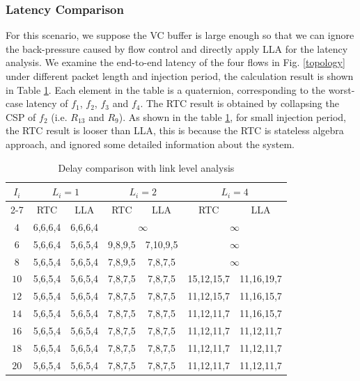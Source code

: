 \documentclass[10pt,journal]{IEEEtran}
\begin{document}
\subsubsection{Latency Comparison}
For this scenario, we suppose the VC buffer is large enough so that we can ignore the back-pressure caused by flow control and directly apply LLA for the latency analysis. We examine the end-to-end latency of the four flows in Fig. \ref{topology} under different packet length and injection period, the calculation result is shown in Table \ref{LLAvsRTC}. Each element in the table is a quaternion, corresponding to the worst-case latency of $f_1$, $f_2$, $f_3$ and $f_4$. The RTC result is obtained by collapsing the CSP of $f_2$ (i.e. $R_{13}$ and $R_{9}$). As shown in the table \ref{LLAvsRTC}, for small injection period, the RTC result is looser than LLA, this is because the RTC is stateless algebra approach, and ignored some detailed information about the system.
\begin{table}[htbp]
\centering
\caption{\label{LLAvsRTC}Delay comparison with link level analysis}
\begin{tabular}{|c|c|c|c|c|c|c|}
\hline
\multirow{3}{*}{$I_i$}  & \multicolumn{2}{|c|}{$L_i=1$} & \multicolumn{2}{|c|}{$L_i=2$}    &   \multicolumn{2}{|c|}{$L_i=4$} \\
\cline{2-7}
& RTC & LLA & RTC & LLA &   RTC &   LLA\\
\hline
$4$ &   6,6,6,4 &   6,6,6,4 &   \multicolumn{2}{|c|}{$\infty$}   &   \multicolumn{2}{|c|}{$\infty$}\\
\hline
$6$ &   5,6,6,4 &   5,6,5,4 &   9,8,9,5 &   7,10,9,5   &   \multicolumn{2}{|c|}{$\infty$}\\
\hline
$8$ &   5,6,5,4 &   5,6,5,4 &   7,8,9,5 &   7,8,7,5 &   \multicolumn{2}{|c|}{$\infty$}\\
\hline
$10$ &   5,6,5,4 &   5,6,5,4 &   7,8,7,5 &   7,8,7,5 &   15,12,15,7 &   11,16,19,7 \\
\hline
$12$    &   5,6,5,4 &   5,6,5,4 &   7,8,7,5 &   7,8,7,5 &   11,12,15,7  &   11,16,15,7\\
\hline
$14$    &   5,6,5,4 &   5,6,5,4 &   7,8,7,5 &   7,8,7,5 &   11,12,11,7  &   11,16,15,7\\
\hline
$16$    &   5,6,5,4 &   5,6,5,4 &   7,8,7,5 &   7,8,7,5 &   11,12,11,7  &   11,12,11,7\\
\hline
$18$    &   5,6,5,4 &   5,6,5,4 &   7,8,7,5 &   7,8,7,5 &   11,12,11,7  &   11,12,11,7\\
\hline
$20$    &   5,6,5,4 & 5,6,5,4   &   7,8,7,5 &   7,8,7,5 &   11,12,11,7  &   11,12,11,7\\
\hline
\end{tabular}
\end{table}
\end{document}
